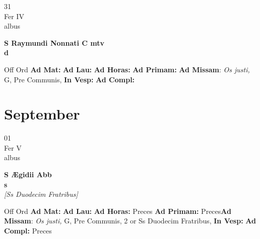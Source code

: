 \documentclass[10pt, openany]{book}
\begin{document}
        \begin{center}
            \begin{minipage}{3.5in}
                \vspace{2em}
                \begin{minipage}{0.5in}
                    {\Huge 31} \\
                    {\normalsize Fer IV} \\
                    {\normalsize albus}
                \end{minipage}
                \begin{minipage}{3.0in}
                    \textbf{ \large S Raymundi Nonnati C mtv \\
                    \textnormal{\normalsize d}} \\ 
                \end{minipage}
                \begin{justify}Off Ord
                    \textbf{Ad Mat: }
                    \textbf{Ad Lau: }
                    \textbf{Ad Horas: }
                    \textbf{Ad Primam: }\textbf{Ad Missam}: \textit{Os justi,} G, Pre Communis,  
                    \textbf{In Vesp: }
                    \textbf{Ad Compl: }
                \end{justify}
            \end{minipage}
        \end{center}
    
        \chapter{September}
                        
        \begin{center}
            \begin{minipage}{3.5in}
                \vspace{2em}
                \begin{minipage}{0.5in}
                    {\Huge 01} \\
                    {\normalsize Fer V} \\
                    {\normalsize albus}
                \end{minipage}
                \begin{minipage}{3.0in}
                    \textbf{ \large S Ægidii Abb \\
                    \textnormal{\normalsize s}} \\ \textit{[Ss Duodecim Fratribus]} \\ 
                \end{minipage}
                \begin{justify}Off Ord
                    \textbf{Ad Mat: }
                    \textbf{Ad Lau: }
                    \textbf{Ad Horas: }Preces
                    \textbf{Ad Primam: }Preces\textbf{Ad Missam}: \textit{Os justi,} G, Pre Communis, 2 or Ss Duodecim Fratribus,  
                    \textbf{In Vesp: }
                    \textbf{Ad Compl: }Preces
                \end{justify}
            \end{minipage}
        \end{center}
    
\end{document}
